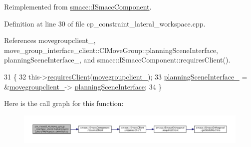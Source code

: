 Reimplemented from \hyperlink{classsmacc_1_1ISmaccComponent_ae6f71d008db12553912e9436184b9e65}{smacc\+::\+I\+Smacc\+Component}.



Definition at line 30 of file cp\+\_\+constraint\+\_\+lateral\+\_\+workspace.\+cpp.



References movegroupclient\+\_\+, move\+\_\+group\+\_\+interface\+\_\+client\+::\+Cl\+Move\+Group\+::planning\+Scene\+Interface, planning\+Scene\+Interface\+\_\+, and smacc\+::\+I\+Smacc\+Component\+::requires\+Client().


\begin{DoxyCode}
31         \{
32             this->\hyperlink{classsmacc_1_1ISmaccComponent_a36c085d906fbae0fcaee817aaeafebf4}{requiresClient}(\hyperlink{classsm__moveit__4_1_1move__group__interface__client_1_1CpConstraintLateralWorkspace_ab8a1340b115e80c9b5b4ece956a737dd}{movegroupclient\_});
33             \hyperlink{classsm__moveit__4_1_1move__group__interface__client_1_1CpConstraintLateralWorkspace_a4fc20ba3e0f44b4a85b1db67d3d6ce28}{planningSceneInterface\_} = &\hyperlink{classsm__moveit__4_1_1move__group__interface__client_1_1CpConstraintLateralWorkspace_ab8a1340b115e80c9b5b4ece956a737dd}{movegroupclient\_}->
      \hyperlink{classmove__group__interface__client_1_1ClMoveGroup_a401213ca52233581d2a659dbb772720c}{planningSceneInterface};
34         \}
\end{DoxyCode}
Here is the call graph for this function\+:
\nopagebreak
\begin{figure}[H]
\begin{center}
\leavevmode
\includegraphics[width=350pt]{classsm__moveit__4_1_1move__group__interface__client_1_1CpConstraintLateralWorkspace_a487463ced53c88f0c0d55d8fcb343da1_cgraph}
\end{center}
\end{figure}
\mbox{\label{classsm__moveit__4_1_1move__group__interface__client_1_1CpConstraintLateralWorkspace_a2f4341da0a276e9d9f792f61ef18528c}} 

